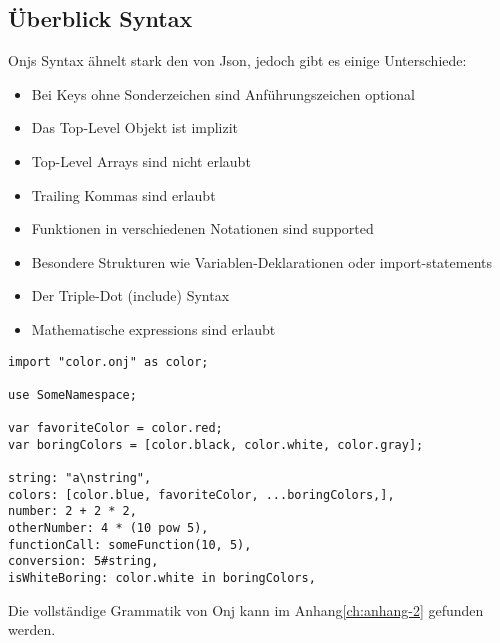 
\subsection{Überblick Syntax}\label{subsec:ueberblick-syntax}

\renewcommand{\kapitelautor}{Autor: Marvin Kurka}

Onjs Syntax ähnelt stark den von Json, jedoch gibt es einige Unterschiede:
\begin{itemize}
    \item Bei Keys ohne Sonderzeichen sind Anführungszeichen optional
    \item Das Top-Level Objekt ist implizit
    \item Top-Level Arrays sind nicht erlaubt
    \item Trailing Kommas sind erlaubt
    \item Funktionen in verschiedenen Notationen sind supported
    \item Besondere Strukturen wie Variablen-Deklarationen oder import-statements
    \item Der Triple-Dot (include) Syntax
    \item Mathematische expressions sind erlaubt
\end{itemize}

\begin{verbatim}
import "color.onj" as color;

use SomeNamespace;

var favoriteColor = color.red;
var boringColors = [color.black, color.white, color.gray];

string: "a\nstring",
colors: [color.blue, favoriteColor, ...boringColors,],
number: 2 + 2 * 2,
otherNumber: 4 * (10 pow 5),
functionCall: someFunction(10, 5),
conversion: 5#string,
isWhiteBoring: color.white in boringColors,
\end{verbatim}

\begin{infoBox}
Die vollständige Grammatik von Onj kann im Anhang\ref{ch:anhang-2} gefunden werden.
\end{infoBox}

\renewcommand{\kapitelautor}{}

